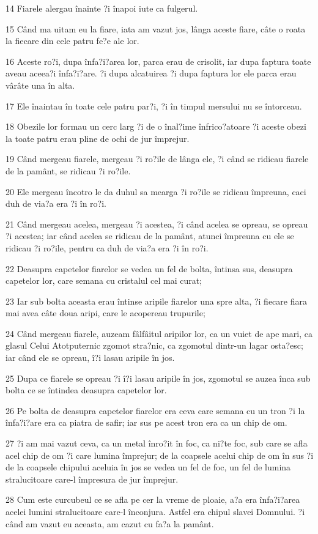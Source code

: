 \par 14 Fiarele alergau înainte ?i înapoi iute ca fulgerul.
\par 15 Când ma uitam eu la fiare, iata am vazut jos, lânga aceste fiare, câte o roata la fiecare din cele patru fe?e ale lor.
\par 16 Aceste ro?i, dupa înfa?i?area lor, parca erau de crisolit, iar dupa faptura toate aveau aceea?i înfa?i?are. ?i dupa alcatuirea ?i dupa faptura lor ele parca erau vârâte una în alta.
\par 17 Ele înaintau în toate cele patru par?i, ?i în timpul mersului nu se întorceau.
\par 18 Obezile lor formau un cerc larg ?i de o înal?ime înfrico?atoare ?i aceste obezi la toate patru erau pline de ochi de jur împrejur.
\par 19 Când mergeau fiarele, mergeau ?i ro?ile de lânga ele, ?i când se ridicau fiarele de la pamânt, se ridicau ?i ro?ile.
\par 20 Ele mergeau încotro le da duhul sa mearga ?i ro?ile se ridicau împreuna, caci duh de via?a era ?i în ro?i.
\par 21 Când mergeau acelea, mergeau ?i acestea, ?i când acelea se opreau, se opreau ?i acestea; iar când acelea se ridicau de la pamânt, atunci împreuna cu ele se ridicau ?i ro?ile, pentru ca duh de via?a era ?i în ro?i.
\par 22 Deasupra capetelor fiarelor se vedea un fel de bolta, întinsa sus, deasupra capetelor lor, care semana cu cristalul cel mai curat;
\par 23 Iar sub bolta aceasta erau întinse aripile fiarelor una spre alta, ?i fiecare fiara mai avea câte doua aripi, care le acopereau trupurile;
\par 24 Când mergeau fiarele, auzeam fâlfâitul aripilor lor, ca un vuiet de ape mari, ca glasul Celui Atotputernic zgomot stra?nic, ca zgomotul dintr-un lagar osta?esc; iar când ele se opreau, î?i lasau aripile în jos.
\par 25 Dupa ce fiarele se opreau ?i î?i lasau aripile în jos, zgomotul se auzea înca sub bolta ce se întindea deasupra capetelor lor.
\par 26 Pe bolta de deasupra capetelor fiarelor era ceva care semana cu un tron ?i la înfa?i?are era ca piatra de safir; iar sus pe acest tron era ca un chip de om.
\par 27 ?i am mai vazut ceva, ca un metal înro?it în foc, ca ni?te foc, sub care se afla acel chip de om ?i care lumina împrejur; de la coapsele acelui chip de om în sus ?i de la coapsele chipului aceluia în jos se vedea un fel de foc, un fel de lumina stralucitoare care-l împresura de jur împrejur.
\par 28 Cum este curcubeul ce se afla pe cer la vreme de ploaie, a?a era înfa?i?area acelei lumini stralucitoare care-l înconjura. Astfel era chipul slavei Domnului. ?i când am vazut eu aceasta, am cazut cu fa?a la pamânt.

